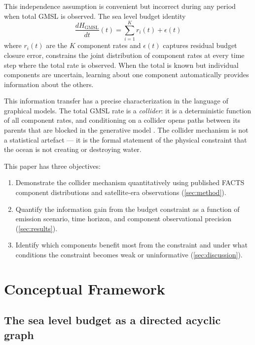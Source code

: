 \documentclass[11pt]{article}
\newcommand{\GMSL}{\text{GMSL}}
\begin{document}
This independence assumption is convenient but incorrect during any period when total GMSL is observed.  The sea level budget identity
\begin{equation}
  \frac{dH_{\GMSL}}{dt}(t) = \sum_{i=1}^{K} r_i(t) + \epsilon(t)
  \label{eq:budget}
\end{equation}
where $r_i(t)$ are the $K$ component rates and $\epsilon(t)$ captures residual budget closure error, constrains the joint distribution of component rates at every time step where the total rate is observed.  When the total is known but individual components are uncertain, learning about one component automatically provides information about the others.

This information transfer has a precise characterization in the language of graphical models.  The total GMSL rate is a \emph{collider}: it is a deterministic function of all component rates, and conditioning on a collider opens paths between its parents that are blocked in the generative model \citep{pearl2009causality}.  The collider mechanism is not a statistical artefact --- it is the formal statement of the physical constraint that the ocean is not creating or destroying water.

This paper has three objectives:
\begin{enumerate}
  \item Demonstrate the collider mechanism quantitatively using published FACTS component distributions and satellite-era observations (\cref{sec:method}).
  \item Quantify the information gain from the budget constraint as a function of emission scenario, time horizon, and component observational precision (\cref{sec:results}).
  \item Identify which components benefit most from the constraint and under what conditions the constraint becomes weak or uninformative (\cref{sec:discussion}).
\end{enumerate}


\section{Conceptual Framework}
\label{sec:concept}

\subsection{The sea level budget as a directed acyclic graph}
\end{document}
